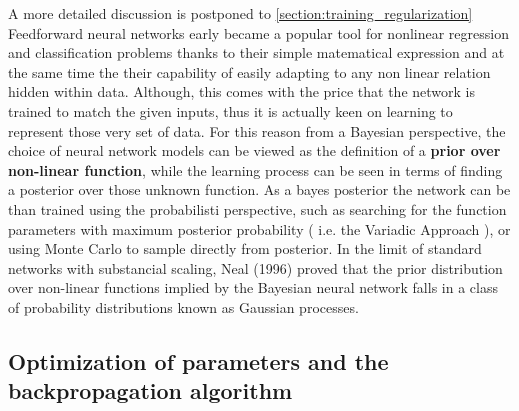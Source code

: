 A more detailed discussion is postponed to \cref{section:training_regularization}
%
Feedforward neural networks early became a popular tool for nonlinear regression and classification problems thanks to their simple matematical expression and at the same time the their capability of easily adapting to any non linear relation hidden within data. Although, this comes with the price that the network is trained to match the given inputs, thus it is actually keen on learning to represent those very set of data.
%
For this reason from a Bayesian perspective, the choice of neural network models can be viewed as the definition of a \textbf{prior over non-linear function}, while the learning process can be seen in terms of finding a posterior over those unknown function. 
As a bayes posterior the network can be than trained using the probabilisti perspective, such as searching for the function parameters with maximum posterior probability ( i.e. the Variadic Approach ), or using Monte Carlo to sample directly from posterior.
%
In the limit of standard networks with substancial scaling, Neal (1996) proved that the prior distribution over non-linear functions implied by the Bayesian neural network falls in a class of probability distributions known as Gaussian processes. 







\subsection{Optimization of parameters and the backpropagation algorithm}

